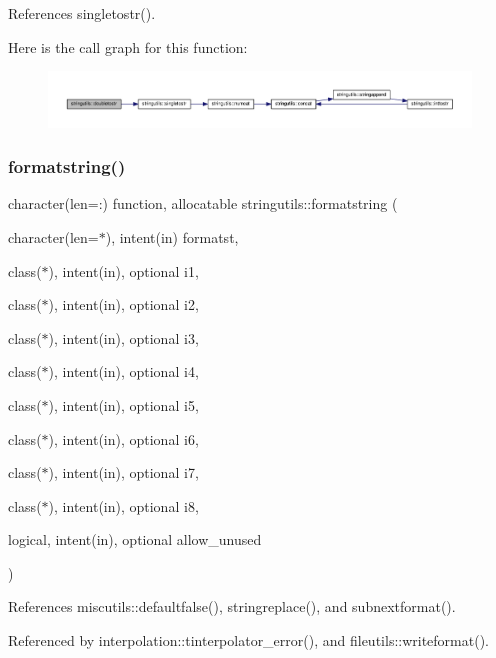 References singletostr().

Here is the call graph for this function\+:
\nopagebreak
\begin{figure}[H]
\begin{center}
\leavevmode
\includegraphics[width=350pt]{namespacestringutils_adb471f3dd9f3594d60675ae521b568a7_cgraph}
\end{center}
\end{figure}
\mbox{\label{namespacestringutils_a27d23a05ef709f393291b263dbbd78c3}} 
\subsubsection{\texorpdfstring{formatstring()}{formatstring()}}
{\footnotesize\ttfamily character(len=\+:) function, allocatable stringutils\+::formatstring (\begin{DoxyParamCaption}\item[{character(len=$\ast$), intent(in)}]{formatst,  }\item[{class($\ast$), intent(in), optional}]{i1,  }\item[{class($\ast$), intent(in), optional}]{i2,  }\item[{class($\ast$), intent(in), optional}]{i3,  }\item[{class($\ast$), intent(in), optional}]{i4,  }\item[{class($\ast$), intent(in), optional}]{i5,  }\item[{class($\ast$), intent(in), optional}]{i6,  }\item[{class($\ast$), intent(in), optional}]{i7,  }\item[{class($\ast$), intent(in), optional}]{i8,  }\item[{logical, intent(in), optional}]{allow\+\_\+unused }\end{DoxyParamCaption})}



References miscutils\+::defaultfalse(), stringreplace(), and subnextformat().



Referenced by interpolation\+::tinterpolator\+\_\+error(), and fileutils\+::writeformat().

